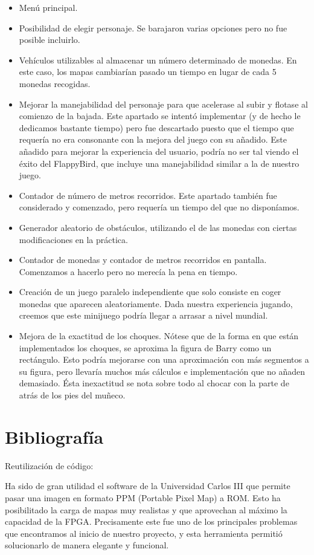 \documentclass[11pt, a4paper, spanish, openright, twoside]{book}
\begin{document}
\begin{itemize}
	\item Menú principal.
	\item Posibilidad de elegir personaje. Se barajaron varias opciones pero no fue posible incluirlo.
	\item Vehículos utilizables al almacenar un número determinado de monedas. En este caso, los mapas cambiarían pasado un tiempo en lugar de cada 5 monedas recogidas.
	\item Mejorar la  manejabilidad del personaje para que acelerase al subir y flotase al comienzo de la bajada. 
	Este apartado se intentó implementar (y de hecho le dedicamos bastante tiempo) pero fue descartado puesto que el tiempo que requería no era consonante con la mejora del juego con su añadido.
	Este añadido  para mejorar la experiencia del usuario, podría no ser tal viendo el éxito del FlappyBird, que incluye una manejabilidad similar a la de nuestro juego.
	\item Contador de número de metros recorridos. Este apartado también fue considerado y comenzado, pero requería un tiempo del que no disponíamos.
	\item Generador aleatorio de obstáculos, utilizando el de las monedas con ciertas modificaciones en la práctica.
	\item Contador de monedas y contador de metros recorridos en pantalla. Comenzamos a hacerlo pero no merecía la pena en tiempo.
	\item Creación de un juego paralelo independiente que solo consiste en coger monedas que aparecen aleatoriamente. Dada nuestra experiencia jugando, creemos que este minijuego podría llegar a arrasar a nivel mundial.
		\item Mejora de la exactitud de los choques.
		Nótese que de la forma en que están implementados los 
		choques, se aproxima la figura de Barry como un rectángulo.
		Esto podría mejorarse con una aproximación con más segmentos a su figura, pero llevaría muchos más cálculos e implementación que no añaden demasiado. Ésta inexactitud se nota sobre todo al chocar 
		con la parte de atrás de los pies del muñeco.
\end{itemize}


\section{Bibliografía}
Reutilización de código:

Ha sido de gran utilidad el software de la Universidad Carlos III que permite pasar una imagen en formato PPM (Portable Pixel Map) a ROM. Esto ha posibilitado la carga de mapas muy realistas y que aprovechan al máximo la capacidad de la FPGA.
Precisamente este fue uno de los principales problemas que encontramos al inicio de nuestro proyecto, y esta herramienta permitió solucionarlo de manera elegante y funcional. 
\end{document}
